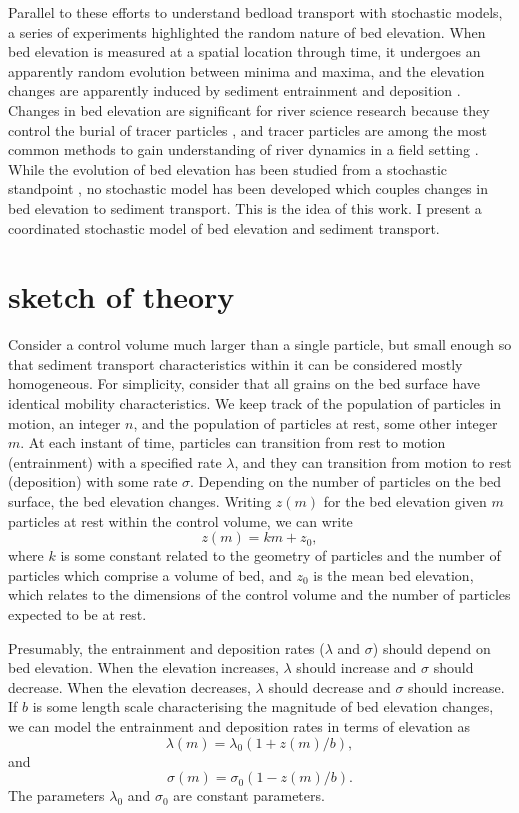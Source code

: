 \documentclass{article}
\newcommand\be{\begin{equation}} %
\newcommand\ee{\end{equation}}   %
\begin{document}
Parallel to these efforts to understand bedload transport with stochastic models, a series of experiments highlighted the random nature of bed elevation. 
When bed elevation is measured at a spatial location through time, it undergoes an apparently random evolution between minima and maxima, and the elevation changes are apparently induced by sediment entrainment and deposition \citep{Wong2007, Singh2009}. 
Changes in bed elevation are significant for river science research because they control the burial of tracer particles \citep{Voepel2013}, and tracer particles are among the most common methods to gain understanding of river dynamics in a field setting \citep[e.g.][]{Hassan2017}. 
While the evolution of bed elevation has been studied from a stochastic standpoint \citep{Martin2014}, no stochastic model has been developed which couples changes in bed elevation to sediment transport. 
This is the idea of this work.
I present a coordinated stochastic model of bed elevation and sediment transport. 

\section{sketch of theory}
Consider a control volume much larger than a single particle, but small enough so that sediment transport characteristics within it can be considered mostly homogeneous. 
For simplicity, consider that all grains on the bed surface have identical mobility characteristics. 
We keep track of the population of particles in motion, an integer $n$, and the population of particles at rest, some other integer $m$. 
At each instant of time, particles can transition from rest to motion (entrainment) with a specified rate $\lambda$, and they can transition from motion to rest (deposition) with some rate $\sigma$. 
Depending on the number of particles on the bed surface, the bed elevation changes. 
Writing $z(m)$ for the bed elevation given $m$ particles at rest within the control volume, we can write
\be z(m) = k m + z_0, \ee
where $k$ is some constant related to the geometry of particles and the number of particles which comprise a volume of bed, and $z_0$ is the mean bed elevation, which relates to the dimensions of the control volume and the number of particles expected to be at rest. 

Presumably, the entrainment and deposition rates ($\lambda$ and $\sigma$) should depend on bed elevation. 
When the elevation increases, $\lambda$ should increase and $\sigma$ should decrease. 
When the elevation decreases, $\lambda$ should decrease and $\sigma$ should increase. 
If $b$ is some length scale characterising the magnitude of bed elevation changes, we can model the entrainment and deposition rates in terms of elevation as
\be \lambda(m) = \lambda_0 (1+z(m)/b), \ee
and 
\be \sigma(m) = \sigma_0 ( 1-z(m)/b). \ee
The parameters $\lambda_0$ and $\sigma_0$ are constant parameters. 
\end{document}
